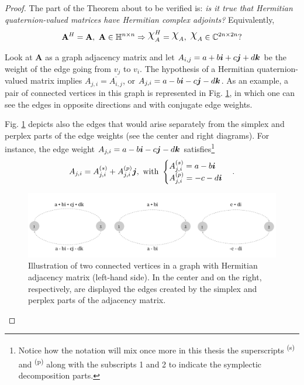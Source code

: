 \begin{proof}
    The part of the Theorem about to be verified is: \emph{is it true that Hermitian quaternion-valued matrices have Hermitian complex adjoints?} Equivalently,
    \begin{equation}
        \mathbf{A}^H = \mathbf{A}, \ \mathbf{A} \in \mathbb{H}^{n \times n} \Rightarrow
        \rchi_{A}^H = \rchi_{A}, \ \rchi_{A} \in \mathbb{C}^{2n \times 2n}?
    \end{equation}

    Look at $\mathbf{A}$ as a graph adjacency matrix and let $A_{i,j} = a + b\boldsymbol{i} + c\boldsymbol{j} + d\boldsymbol{k}$ be the weight of the edge going from $v_j$ to $v_i$. The hypothesis of a Hermitian quaternion-valued matrix implies $A_{j,i} = \overline{A_{i,j}}$, or $A_{j,i} = a - b\boldsymbol{i} - c\boldsymbol{j} - d\boldsymbol{k}$. As an example, a pair of connected vertices in this graph is represented in Fig. \ref{fig:hermitian-crop-2}, in which one can see the edges in opposite directions and with conjugate edge weights.

    Fig. \ref{fig:hermitian-crop-2} depicts also the edges that would arise separately from the simplex and perplex parts of the edge weights (see the center and right diagrams). For instance, the edge weight $A_{j,i} = a - b\boldsymbol{i} - c\boldsymbol{j} - d\boldsymbol{k}$ satisfies\footnote{Notice how the notation will mix once more in this thesis the superscripts \textsuperscript{(s)} and \textsuperscript{(p)} along with the subscripts 1 and 2 to indicate the symplectic decomposition parts.}
    \begin{equation}
        A_{j,i} = A^{(s)}_{j,i} + A^{(p)}_{j,i} \boldsymbol{j}, \text{ with }
        \begin{cases}
            A^{(s)}_{j,i} = a - b\boldsymbol{i} \\
            A^{(p)}_{j,i} = -c -d \boldsymbol{i}
        \end{cases}.
    \end{equation}

    \begin{figure}
        \centering
        \includegraphics[width=0.95\linewidth]{Figures/hermitian-crop-2.pdf}
        \caption{Illustration of two connected vertices in a graph with Hermitian adjacency matrix (left-hand side). In the center and on the right, respectively, are displayed the edges created by the simplex and perplex parts of the adjacency matrix.}
        \label{fig:hermitian-crop-2}
    \end{figure}


\end{proof}
